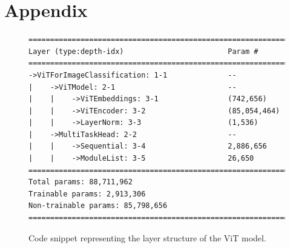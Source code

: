 \documentclass{article}
\begin{document}
\section{Appendix}

\begin{figure}[ht]
    \centering
    \begin{lstlisting}[language=TeX]
======================================================================
Layer (type:depth-idx)                        Param #
======================================================================
->ViTForImageClassification: 1-1              --
|    ->ViTModel: 2-1                          --
|    |    ->ViTEmbeddings: 3-1                (742,656)
|    |    ->ViTEncoder: 3-2                   (85,054,464)
|    |    ->LayerNorm: 3-3                    (1,536)
|    ->MultiTaskHead: 2-2                     --
|    |    ->Sequential: 3-4                   2,886,656
|    |    ->ModuleList: 3-5                   26,650
======================================================================
Total params: 88,711,962
Trainable params: 2,913,306
Non-trainable params: 85,798,656
======================================================================
    \end{lstlisting}
    \caption{Code snippet representing the layer structure of the ViT model.}
    \label{app:model}
\end{figure}
\end{document}
